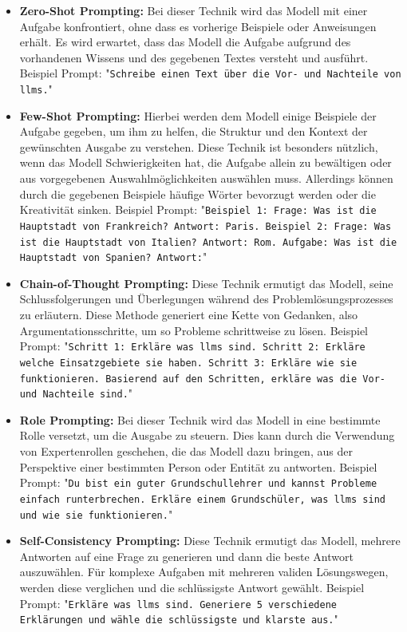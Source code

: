 \begin{itemize}
    \item \textbf{Zero-Shot Prompting:} Bei dieser Technik wird das Modell mit einer Aufgabe konfrontiert, ohne dass es vorherige Beispiele oder Anweisungen erhält. Es wird erwartet, dass das Modell die Aufgabe aufgrund des vorhandenen Wissens und des gegebenen Textes versteht und ausführt.
    Beispiel Prompt: "\texttt{Schreibe einen Text über die Vor- und Nachteile von \acp{llm}.}"
    \item \textbf{Few-Shot Prompting:} Hierbei werden dem Modell einige Beispiele der Aufgabe gegeben, um ihm zu helfen, die Struktur und den Kontext der gewünschten Ausgabe zu verstehen. Diese Technik ist besonders nützlich, wenn das Modell Schwierigkeiten hat, die Aufgabe allein zu bewältigen oder aus vorgegebenen Auswahlmöglichkeiten auswählen muss. Allerdings können durch die gegebenen Beispiele häufige Wörter bevorzugt werden oder die Kreativität sinken.
    Beispiel Prompt: "\texttt{Beispiel 1: Frage: Was ist die Hauptstadt von Frankreich? Antwort: Paris. Beispiel 2: Frage: Was ist die Hauptstadt von Italien? Antwort: Rom. Aufgabe: Was ist die Hauptstadt von Spanien? Antwort:}"
    \item \textbf{Chain-of-Thought Prompting:} Diese Technik ermutigt das Modell, seine Schlussfolgerungen und Überlegungen während des Problemlösungsprozesses zu erläutern. Diese Methode generiert eine Kette von Gedanken, also Argumentationsschritte, um so Probleme schrittweise zu lösen.
    Beispiel Prompt: "\texttt{Schritt 1: Erkläre was \acp{llm} sind. Schritt 2: Erkläre welche Einsatzgebiete sie haben. Schritt 3: Erkläre wie sie funktionieren. Basierend auf den Schritten, erkläre was die Vor- und Nachteile sind.}"
    \item \textbf{Role Prompting:} Bei dieser Technik wird das Modell in eine bestimmte Rolle versetzt, um die Ausgabe zu steuern. Dies kann durch die Verwendung von Expertenrollen geschehen, die das Modell dazu bringen, aus der Perspektive einer bestimmten Person oder Entität zu antworten. \cite{prompt-role}
    Beispiel Prompt: "\texttt{Du bist ein guter Grundschullehrer und kannst Probleme einfach runterbrechen. Erkläre einem Grundschüler, was \acp{llm} sind und wie sie funktionieren.}"
    \item \textbf{Self-Consistency Prompting:} Diese Technik ermutigt das Modell, mehrere Antworten auf eine Frage zu generieren und dann die beste Antwort auszuwählen. Für komplexe Aufgaben mit mehreren validen Lösungswegen, werden diese verglichen und die schlüssigste Antwort gewählt. 
    Beispiel Prompt: "\texttt{Erkläre was \acp{llm} sind. Generiere 5 verschiedene Erklärungen und wähle die schlüssigste und klarste aus.}"
\end{itemize}

